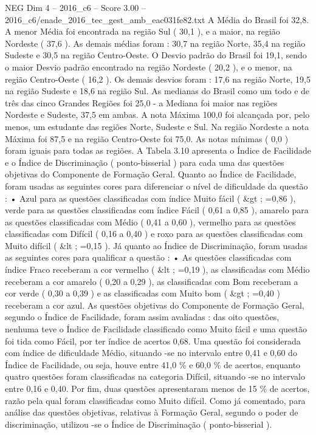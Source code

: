 \begin{textsample}{NEG Dim 4 – 2016\_c6 – Score 3.00 – 2016\_c6/enade\_2016\_tec\_gest\_amb\_eac031fe82.txt}
A Média do Brasil foi 32,8.
A menor Média foi encontrada na região Sul ( 30,1 ), e a maior, na região Nordeste ( 37,6 ).
As demais médias foram : 30,7 na região Norte, 35,4 na região Sudeste e 30,5 na região Centro-Oeste.
O Desvio padrão do Brasil foi 19,1, sendo o maior Desvio padrão encontrado na região Nordeste ( 20,2 ), e o menor, na região Centro-Oeste ( 16,2 ).
Os demais desvios foram : 17,6 na região Norte, 19,5 na região Sudeste e 18,6 na região Sul.
As medianas do Brasil como um todo e de três das cinco Grandes Regiões foi 25,0 - a Mediana foi maior nas regiões Nordeste e Sudeste, 37,5 em ambas.
A nota Máxima 100,0 foi alcançada por, pelo menos, um estudante das regiões Norte, Sudeste e Sul.
Na região Nordeste a nota Máxima foi 87,5 e na região Centro-Oeste foi 75,0.
As notas mínimas ( 0,0 ) foram iguais para todas as regiões.
A Tabela 3.10 apresenta o Índice de Facilidade e o Índice de Discriminação ( ponto-bisserial ) para cada uma das questões objetivas do Componente de Formação Geral.
Quanto ao Índice de Facilidade, foram usadas as seguintes cores para diferenciar o nível de dificuldade da questão : • Azul para as questões classificadas com índice Muito fácil ( \&gt ; =0,86 ), verde para as questões classificadas com índice Fácil ( 0,61 a 0,85 ), amarelo para as questões classificadas com Médio ( 0,41 a 0,60 ), vermelho para as questões classificadas com Difícil ( 0,16 a 0,40 ) e roxo para as questões classificadas com Muito difícil ( \&lt ; =0,15 ).
Já quanto ao Índice de Discriminação, foram usadas as seguintes cores para qualificar a questão : • As questões classificadas com índice Fraco receberam a cor vermelho ( \&lt ; =0,19 ), as classificadas com Médio receberam a cor amarelo ( 0,20 a 0,29 ), as classificadas com Bom receberam a cor verde ( 0,30 a 0,39 ) e as classificadas com Muito bom ( \&gt ; =0,40 ) receberam a cor azul.
As questões objetivas do Componente de Formação Geral, segundo o Índice de Facilidade, foram assim avaliadas : das oito questões, nenhuma teve o Índice de Facilidade classificado como Muito fácil e uma questão foi tida como Fácil, por ter índice de acertos 0,68.
Uma questão foi considerada com índice de dificuldade Médio, situando -se no intervalo entre 0,41 e 0,60 do Índice de Facilidade, ou seja, houve entre 41,0 \% e 60,0 \% de acertos, enquanto quatro questões foram classificadas na categoria Difícil, situando -se no intervalo entre 0,16 e 0,40.
Por fim, duas questões apresentaram menos de 15 \% de acertos, razão pela qual foram classificadas como Muito difícil.
Como já comentado, para análise das questões objetivas, relativas à Formação Geral, segundo o poder de discriminação, utilizou -se o Índice de Discriminação ( ponto-bisserial ).

\end{textsample}
